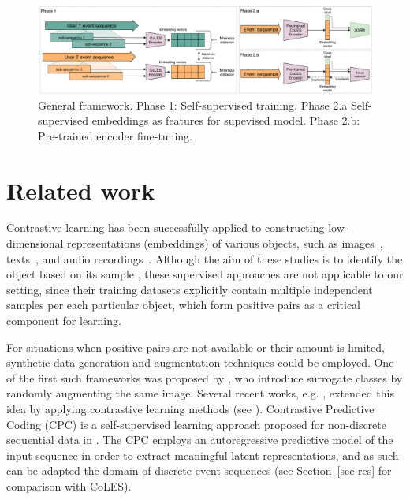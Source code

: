 \documentclass[sigconf, anonymous]{acmart}
\begin{document}
\begin{figure}[htbp]
  \includegraphics[width=\linewidth]{figures/CoLES.pdf}
    \caption{
        General framework.
        Phase 1: Self-supervised training.
        Phase 2.a Self-supervised embeddings as features for supevised model.
        Phase 2.b: Pre-trained encoder fine-tuning.
    }
  \label{fig-arch}
\end{figure}

\section{Related work} \label{sec-rel-work}

Contrastive learning has been successfully applied to constructing low-dimensional representations
(embeddings) of various objects, such as images~\citep{Chopra2005LearningAS,Schroff2015FaceNetAU},
texts~\citep{Reimers2019SentenceBERTSE}, and audio recordings~\citep{Wan2018GeneralizedEL}.
Although the aim of these studies is to identify the object based on its sample
\citep{Schroff2015FaceNetAU,Hu2014DiscriminativeDM,Wan2018GeneralizedEL}, these supervised
approaches are not applicable to our setting, since their training datasets explicitly contain
multiple independent samples per each particular object, which form positive pairs as
a critical component for learning. 

For situations when positive pairs are not available or their amount is limited, synthetic data
generation and augmentation techniques could be employed. One of the first such frameworks was
proposed by \citet{Dosovitskiy2014DiscriminativeUF}, who introduce surrogate classes by randomly
augmenting the same image. Several recent works, e.g. \citep{Bachman2019LearningRB,He2019MomentumCF,Chen2020ASF},
extended this idea by applying contrastive learning methods (see \citep{Falcon2020AFF}).
%
Contrastive Predictive Coding (CPC) is a self-supervised learning approach proposed for non-discrete
sequential data in \citep{Oord2018RepresentationLW}. The CPC employs an autoregressive predictive
model of the input sequence in order to extract meaningful latent representations, and as such
can be adapted the domain of discrete event sequences (see Section~\ref{sec-res} for comparison
with CoLES).
\end{document}
